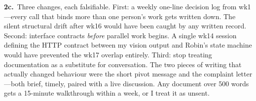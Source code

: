 \textbf{2c.}~Three changes, each falsifiable. First: a weekly one-line decision log from wk1---every call that binds more than one person's work gets written down. The silent structural drift after wk16 would have been caught by any written record. Second: interface contracts \emph{before} parallel work begins. A single wk14 session defining the HTTP contract between my vision output and Robin's state machine would have prevented the wk17 overlap entirely. Third: stop treating documentation as a substitute for conversation. The two pieces of writing that actually changed behaviour were the short pivot message and the complaint letter---both brief, timely, paired with a live discussion. Any document over 500 words gets a 15-minute walkthrough within a week, or I treat it as unsent.
